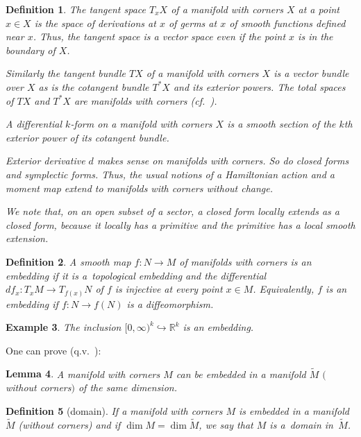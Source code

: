 \documentclass[10pt,a4paper]{amsart}
\numberwithin{equation}{section}
\newtheorem{Lemma}{Lemma}[section]
\newtheorem{Definition}[Lemma]{Definition}
\newtheorem{Example}[Lemma]{Example}
\begin{document}
\begin{Definition}\label{differential forms}
The \emph{tangent space} $T_xX$ of a manifold with corners $X$ at a
point $x\in X$ is the space of derivations at $x$ of germs at $x$ of
smooth functions def\/ined near $x$.  Thus, the tangent space is a
vector space even if the point $x$ is in the boundary of $X$.

Similarly the tangent bundle $TX$ of a manifold with corners $X$ is a
vector bundle over $X$ as is the cotangent bundle $T^*X$ and its
exterior powers. The total spaces of $TX$ and $T^*X$ are manifolds
with corners (cf.~\cite[p.~19]{Michor}).

A {\em differential $k$-form} on a manifold with corners $X$
is a smooth section of the $k$th exterior power of its cotangent bundle.

Exterior derivative $d$ makes sense on manifolds with corners.  So do
closed forms and symplectic forms.
Thus, the usual notions of a Hamiltonian action and a moment map
extend to manifolds with corners without change.

We note that, on an open subset of a sector,
a closed form locally extends as a \emph{closed} form, because
it locally has a primitive and the primitive has a local smooth extension.
\end{Definition}

\begin{Definition}\label{def:embedding}
  A smooth map $f\colon N\to M$ of manifolds with corners is an {\em
    embedding} if it is a~topological embedding and the dif\/ferential
  $df_x\colon T_xM\to T_{f(x)}N$ of $f$ is injective at every point $x\in M$.
  Equivalently, $f$ is an embedding if $f \colon N \to f(N)$
  is a dif\/feomorphism.
\end{Definition}

\begin{Example}
The inclusion $[0,\infty)^k \hookrightarrow {\mathbb R}^k$ is an embedding.
\end{Example}

One can prove (q.v.\ \cite[p.~21]{Michor}):
\begin{Lemma}\label{lem:domain}
  A manifold with corners $M$ can be embedded in a manifold
  $\tilde{M}$ $($without corners$)$ of the same dimension.
\end{Lemma}

\begin{Definition}[domain]\label{def:domain}
  If a manifold with corners $M$ is embedded in a manifold~$\tilde{M}$
  (without corners) and if $\dim M = \dim \tilde{M}$, we say that $M$ is
  a~{\em domain} in~$\tilde{M}$.
\end{Definition}
\end{document}
